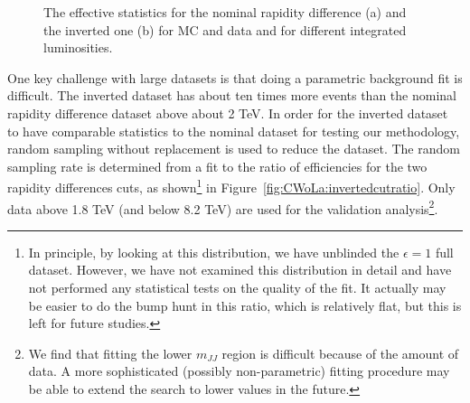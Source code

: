 \begin{figure}[h!]
\centering
{}
\caption{The effective statistics for the nominal rapidity difference (a) and the inverted one (b) for MC and data and for different integrated luminosities.}
\label{fig:CWoLa:effectivestats}
\end{figure}

One key challenge with large datasets is that doing a parametric background fit is difficult.  The inverted dataset has about ten times more events than the nominal rapidity difference dataset above about 2 TeV.  In order for the inverted dataset to have comparable statistics to the nominal dataset for testing our methodology, random sampling without replacement is used to reduce the dataset.  The random sampling rate is determined from a fit to the ratio of efficiencies for the two rapidity differences cuts, as shown\footnote{In principle, by looking at this distribution, we have unblinded the $\epsilon=1$ full dataset.  However, we have not examined this distribution in detail and have not performed any statistical tests on the quality of the fit.  It actually may be easier to do the bump hunt in this ratio, which is relatively flat, but this is left for future studies.} in Figure~\ref{fig:CWoLa:invertedcutratio}.   Only data above 1.8 TeV (and below 8.2 TeV) are used for the validation analysis\footnote{We find that fitting the lower $m_{JJ}$ region is difficult because of the amount of data.  A more sophisticated (possibly non-parametric) fitting procedure may be able to extend the search to lower values in the future.}. 

